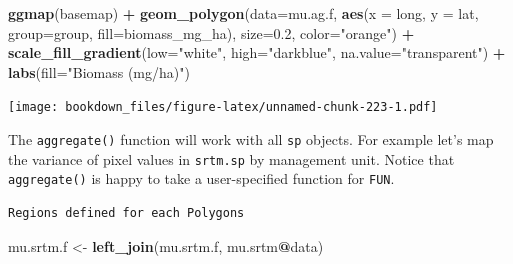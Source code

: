\documentclass[
]{krantz}
\makeatletter
\newenvironment{Shaded}{\begin{snugshade}}{\end{snugshade}}
\newcommand{\ControlFlowTok}[1]{\textcolor[rgb]{0.27,0.27,0.27}{\textbf{#1}}}
\newcommand{\DataTypeTok}[1]{\textcolor[rgb]{0.27,0.27,0.27}{#1}}
\newcommand{\FloatTok}[1]{\textcolor[rgb]{0.06,0.06,0.06}{#1}}
\newcommand{\KeywordTok}[1]{\textcolor[rgb]{0.27,0.27,0.27}{\textbf{#1}}}
\newcommand{\NormalTok}[1]{#1}
\newcommand{\OperatorTok}[1]{\textcolor[rgb]{0.43,0.43,0.43}{\textbf{#1}}}
\newcommand{\StringTok}[1]{\textcolor[rgb]{0.5,0.5,0.5}{#1}}
\newenvironment{kframe}{%
\medskip{}
\setlength{\fboxsep}{.8em}
 \def\at@end@of@kframe{}%
 \ifinner\ifhmode%
  \def\at@end@of@kframe{\end{minipage}}%
  \begin{minipage}{\columnwidth}%
 \fi\fi%
 \def\FrameCommand##1{\hskip\@totalleftmargin \hskip-\fboxsep
 \colorbox{shadecolor}{##1}\hskip-\fboxsep
     \hskip-\linewidth \hskip-\@totalleftmargin \hskip\columnwidth}%
 \MakeFramed {\advance\hsize-\width
   \@totalleftmargin\z@ \linewidth\hsize
   \@setminipage}}%
 {\par\unskip\endMakeFramed%
 \at@end@of@kframe}
\renewenvironment{Shaded}{\begin{kframe}}{\end{kframe}}
\makeatother
\begin{document}
\begin{Shaded}
\begin{Highlighting}[]
\KeywordTok{ggmap}\NormalTok{(basemap) }\OperatorTok{+}
\StringTok{    }\KeywordTok{geom\_polygon}\NormalTok{(}\DataTypeTok{data=}\NormalTok{mu.ag.f, }\KeywordTok{aes}\NormalTok{(}\DataTypeTok{x =}\NormalTok{ long, }\DataTypeTok{y =}\NormalTok{ lat, }
                                \DataTypeTok{group=}\NormalTok{group, }\DataTypeTok{fill=}\NormalTok{biomass\_mg\_ha), }
                 \DataTypeTok{size=}\FloatTok{0.2}\NormalTok{, }\DataTypeTok{color=}\StringTok{"orange"}\NormalTok{) }\OperatorTok{+}
\StringTok{    }\KeywordTok{scale\_fill\_gradient}\NormalTok{(}\DataTypeTok{low=}\StringTok{"white"}\NormalTok{, }\DataTypeTok{high=}\StringTok{"darkblue"}\NormalTok{, }
                        \DataTypeTok{na.value=}\StringTok{"transparent"}\NormalTok{) }\OperatorTok{+}
\StringTok{    }\KeywordTok{labs}\NormalTok{(}\DataTypeTok{fill=}\StringTok{"Biomass (mg/ha)"}\NormalTok{)}
\end{Highlighting}
\end{Shaded}

\texttt{[image: bookdown\_files/figure-latex/unnamed-chunk-223-1.pdf]}

The \texttt{aggregate()} function will work with all \texttt{sp} objects. For example let's map the variance of pixel values in \texttt{srtm.sp} by management unit. Notice that \texttt{aggregate()} is happy to take a user-specified function for \texttt{FUN}.

\begin{Shaded}
\end{Shaded}

\begin{verbatim}
Regions defined for each Polygons
\end{verbatim}

\begin{Shaded}
\begin{Highlighting}[]
\NormalTok{mu.srtm.f \textless{}{-}}\StringTok{ }\KeywordTok{left\_join}\NormalTok{(mu.srtm.f, mu.srtm}\OperatorTok{@}\NormalTok{data)}
\end{Highlighting}
\end{Shaded}
\end{document}
